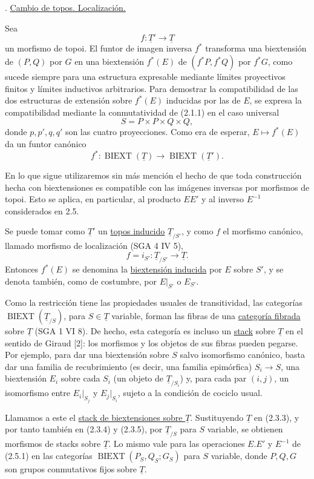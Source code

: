 \par\medskip{}. \underline{Cambio de topos. Localización.}

Sea
\[
 f:\underline T'\longrightarrow\underline T
\]
un morfismo de topoi. El funtor de imagen inversa $f^*$ transforma una
biextensión de $(P,Q)$ por $G$ en una biextensión $f^*(E)$ de
$(f^*P,f^*Q)$ por $f^*G$, como sucede siempre para una estructura
expresable mediante límites proyectivos finitos y límites inductivos
arbitrarios. Para demostrar la compatibilidad de las dos estructuras
de extensión sobre $f^*(E)$ inducidas por las de $E$, se expresa la
compatibilidad mediante la conmutatividad de (2.1.1) en el caso
universal
\[
 S=P\times P\times Q\times Q,
\]
donde $p,p',q,q'$ son las cuatro proyecciones. Como era de esperar,
$E\mapsto f^*(E)$ da un funtor canónico
\[
 f^*:\operatorname{BIEXT}(\underline T)
 \longrightarrow
 \operatorname{BIEXT}(\underline T').
\]

En lo que sigue utilizaremos sin más mención el hecho de que toda
construcción hecha con biextensiones es compatible con las imágenes
inversas por morfismos de topoi. Esto se aplica, en particular, al
producto $EE'$ y al inverso $E^{-1}$ considerados en 2.5.

Se puede tomar como $\underline T'$ un \underline{topos inducido}
$\underline T_{/S'}$, y como $f$ el morfismo canónico, llamado
morfismo de localización (SGA 4 IV 5),
\[
 f=i_{S'}:\underline T_{/S'}\longrightarrow\underline T.
\]
Entonces $f^*(E)$ se denomina la \underline{biextensión inducida} por
$E$ sobre $S'$, y se denota también, como de costumbre, por $E|_{S'}$
o $E_{S'}$.

Como la restricción tiene las propiedades usuales de transitividad,
las categorías $\operatorname{BIEXT}(\underline T_{/S})$, para
$S\in\underline T$ variable, forman las fibras de una
\underline{categoría fibrada} sobre $\underline T$ (SGA 1 VI 8). De
hecho, esta categoría es incluso un \underline{stack} sobre
$\underline T$ en el sentido de Giraud [2]: los morfismos y los
objetos de sus fibras pueden pegarse. Por ejemplo, para dar una
biextensión sobre $S$ salvo isomorfismo canónico, basta dar una familia
de recubrimiento (es decir, una familia epimórfica)
$S_i\longrightarrow S$, una biextensión $E_i$ sobre cada $S_i$ (un
objeto de $\underline T_{/S_i}$) y, para cada par $(i,j)$, un
isomorfismo entre $E_i|_{S_j}$ y $E_j|_{S_i}$, sujeto a la condición de
cociclo usual.

Llamamos a este el \underline{stack de biextensiones sobre
$\underline T$}. Sustituyendo $\underline T$ en (2.3.3), y por tanto
también en (2.3.4) y (2.3.5), por $\underline T_{/S}$ para $S$
variable, se obtienen morfismos de stacks sobre $\underline T$. Lo
mismo vale para las operaciones $E.E'$ y $E^{-1}$ de (2.5.1) en las
categorías $\operatorname{BIEXT}(P_S,Q_S;G_S)$ para $S$ variable,
donde $P,Q,G$ son grupos conmutativos fijos sobre $\underline T$.
